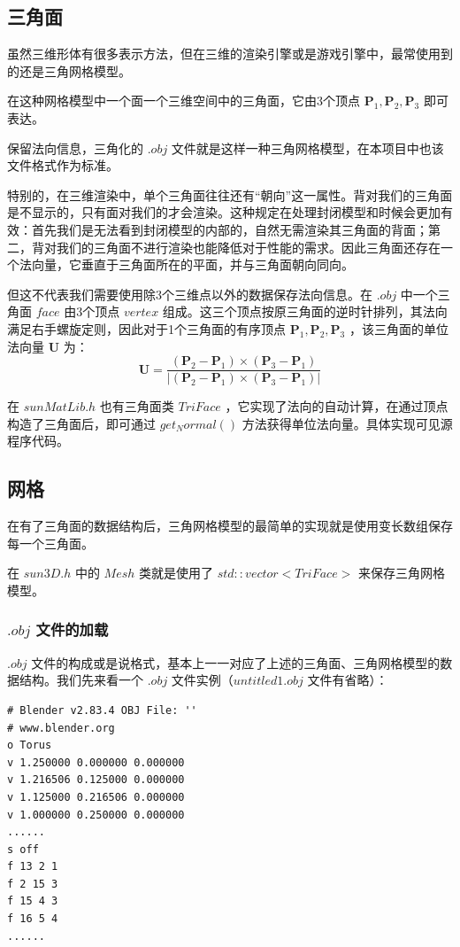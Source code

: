 \documentclass[12pt,oneside,a4paper]{ctexart}
\begin{document}
\subsection{三角面}
虽然三维形体有很多表示方法，但在三维的渲染引擎或是游戏引擎中，最常使用到的还是三角网格模型。

在这种网格模型中一个面一个三维空间中的三角面，它由3个顶点 $\mathbf{P}_1,\mathbf{P}_2, \mathbf{P}_3$ 即可表达。

保留法向信息，三角化的 $.obj$ 文件就是这样一种三角网格模型，在本项目中也该文件格式作为标准。

特别的，在三维渲染中，单个三角面往往还有“朝向”这一属性。背对我们的三角面是不显示的，只有面对我们的才会渲染。这种规定在处理封闭模型和时候会更加有效：首先我们是无法看到封闭模型的内部的，自然无需渲染其三角面的背面；第二，背对我们的三角面不进行渲染也能降低对于性能的需求。因此三角面还存在一个法向量，它垂直于三角面所在的平面，并与三角面朝向同向。

但这不代表我们需要使用除3个三维点以外的数据保存法向信息。在 $.obj$ 中一个三角面 $face$ 由3个顶点 $vertex$ 组成。这三个顶点按原三角面的逆时针排列，其法向满足右手螺旋定则，因此对于1个三角面的有序顶点 $\mathbf{P}_1,\mathbf{P}_2, \mathbf{P}_3$ ，该三角面的单位法向量 $\mathbf{U}$ 为：
\begin{equation*}
	\mathbf{U}=
	\frac{(\mathbf{P}_2 - \mathbf{P}_1)\times
		(\mathbf{P}_3 - \mathbf{P}_1)}{\left\lvert (\mathbf{P}_2 - \mathbf{P}_1)\times
		(\mathbf{P}_3 - \mathbf{P}_1)\right\rvert }
\end{equation*}

在 $sunMatLib.h$ 也有三角面类 $TriFace$ ，它实现了法向的自动计算，在通过顶点构造了三角面后，即可通过 $get_Normal()$ 方法获得单位法向量。具体实现可见源程序代码。
\subsection{网格}
在有了三角面的数据结构后，三角网格模型的最简单的实现就是使用变长数组保存每一个三角面。

在 $sun3D.h$ 中的 $Mesh$ 类就是使用了 $std::vector<TriFace>$ 来保存三角网格模型。
\subsubsection{$.obj$ 文件的加载}

$.obj$ 文件的构成或是说格式，基本上一一对应了上述的三角面、三角网格模型的数据结构。我们先来看一个  $.obj$ 文件实例（$untitled1.obj$ 文件有省略）：

\begin{lstlisting}
# Blender v2.83.4 OBJ File: ''
# www.blender.org
o Torus
v 1.250000 0.000000 0.000000
v 1.216506 0.125000 0.000000
v 1.125000 0.216506 0.000000
v 1.000000 0.250000 0.000000
......
s off
f 13 2 1
f 2 15 3
f 15 4 3
f 16 5 4
......
\end{lstlisting}
\end{document}
